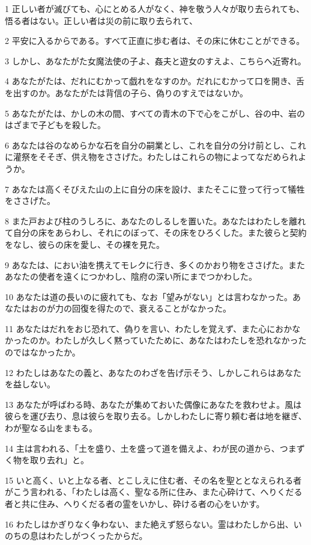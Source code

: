 \par 1 正しい者が滅びても、心にとめる人がなく、神を敬う人々が取り去られても、悟る者はない。正しい者は災の前に取り去られて、
\par 2 平安に入るからである。すべて正直に歩む者は、その床に休むことができる。
\par 3 しかし、あなたがた女魔法使の子よ、姦夫と遊女のすえよ、こちらへ近寄れ。
\par 4 あなたがたは、だれにむかって戯れをなすのか。だれにむかって口を開き、舌を出すのか。あなたがたは背信の子ら、偽りのすえではないか。
\par 5 あなたがたは、かしの木の間、すべての青木の下で心をこがし、谷の中、岩のはざまで子どもを殺した。
\par 6 あなたは谷のなめらかな石を自分の嗣業とし、これを自分の分け前とし、これに灌祭をそそぎ、供え物をささげた。わたしはこれらの物によってなだめられようか。
\par 7 あなたは高くそびえた山の上に自分の床を設け、またそこに登って行って犠牲をささげた。
\par 8 また戸および柱のうしろに、あなたのしるしを置いた。あなたはわたしを離れて自分の床をあらわし、それにのぼって、その床をひろくした。また彼らと契約をなし、彼らの床を愛し、その裸を見た。
\par 9 あなたは、におい油を携えてモレクに行き、多くのかおり物をささげた。またあなたの使者を遠くにつかわし、陰府の深い所にまでつかわした。
\par 10 あなたは道の長いのに疲れても、なお「望みがない」とは言わなかった。あなたはおのが力の回復を得たので、衰えることがなかった。
\par 11 あなたはだれをおじ恐れて、偽りを言い、わたしを覚えず、また心におかなかったのか。わたしが久しく黙っていたために、あなたはわたしを恐れなかったのではなかったか。
\par 12 わたしはあなたの義と、あなたのわざを告げ示そう、しかしこれらはあなたを益しない。
\par 13 あなたが呼ばわる時、あなたが集めておいた偶像にあなたを救わせよ。風は彼らを運び去り、息は彼らを取り去る。しかしわたしに寄り頼む者は地を継ぎ、わが聖なる山をまもる。
\par 14 主は言われる、「土を盛り、土を盛って道を備えよ、わが民の道から、つまずく物を取り去れ」と。
\par 15 いと高く、いと上なる者、とこしえに住む者、その名を聖ととなえられる者がこう言われる、「わたしは高く、聖なる所に住み、また心砕けて、へりくだる者と共に住み、へりくだる者の霊をいかし、砕ける者の心をいかす。
\par 16 わたしはかぎりなく争わない、また絶えず怒らない。霊はわたしから出、いのちの息はわたしがつくったからだ。
